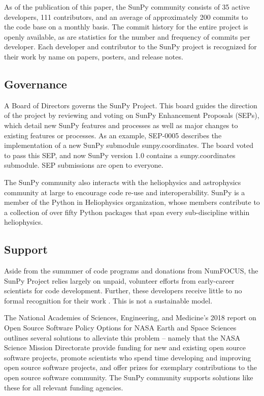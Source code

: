 As of the publication of this paper, the SunPy community consists of 35 active developers, 111 contributors, and an average of approximately 200 commits to the code base on a monthly basis. The commit history for the entire project is openly available, as are statistics for the number and frequency of commits per developer. Each developer and contributor to the SunPy project is recognized for their work by name on papers, posters, and release notes.

\subsection{Governance}
A Board of Directors governs the SunPy Project. This board guides the direction of the project by reviewing and voting on SunPy Enhancement Proposals (SEPs), which detail new SunPy features and processes as well as major changes to existing features or processes. As an example, SEP-0005 describes the implementation of a new SunPy submodule sunpy.coordinates. The board voted to pass this SEP, and now SunPy version 1.0 contains a sunpy.coordinates submodule. SEP submissions are open to everyone.

The SunPy community also interacts with the heliophysics and astrophysics community at large to encourage code re-use and interoperability. SunPy is a member of the Python in Heliophysics organization, whose members contribute to a collection of over fifty Python packages that span every sub-discipline within heliophysics. 

\subsection{Support}
Aside from the summmer of code programs and donations from NumFOCUS, the SunPy Project relies largely on unpaid, volunteer efforts from early-career scientists for code development. Further, these developers receive little to no formal recognition for their work \citep{Muna2016}. This is not a sustainable model. 

The National Academies of Sciences, Engineering, and Medicine's 2018 report on Open Source Software Policy Options for NASA Earth and Space Sciences \citep{NAP2018} outlines several solutions to alleviate this problem -- namely that the NASA Science Mission Directorate provide funding for new and existing open source software projects, promote scientists who spend time developing and improving open source software projects, and offer prizes for exemplary contributions to the open source software community. The SunPy community supports solutions like these for all relevant funding agencies. 